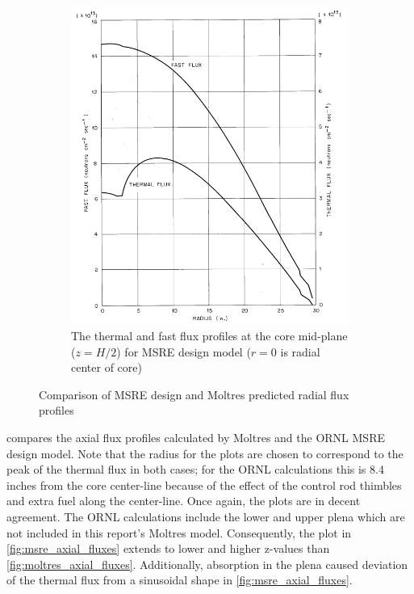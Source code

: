 \documentclass{article}
\makeatletter
\def\maxwidth#1{\ifdim\Gin@nat@width>#1 #1\else\Gin@nat@width\fi}
\makeatother
\begin{document}
\begin{figure}[htpb]
\begin{subfigure}[b]{.5\textwidth}
      \includegraphics[width=\maxwidth{\textwidth}]{msre_radial_fluxes.png}
      \caption{The thermal and fast flux profiles at the core mid-plane
        ($z=H/2$) for \gls{MSRE} design model \cite{briggs_molten-salt_1964}
        ($r=0$ is radial center of core)}
      \label{fig:msre_radial_fluxes}
    \end{subfigure}
    \caption{Comparison of \gls{MSRE} design and Moltres predicted radial
      flux profiles}
    \label{fig:radial_fluxes_compare}
\end{figure}

 compares the axial flux profiles calculated by
Moltres and the \gls{ORNL} \gls{MSRE} design model. Note that the radius for the
plots are chosen to correspond to the peak of the thermal flux in both cases;
for the \gls{ORNL} calculations this is 8.4 inches from the core center-line
because of the effect of the control rod thimbles and extra fuel along the
center-line. Once again, the plots are in decent agreement. The \gls{ORNL}
calculations include the lower and upper plena which are not included in this
report's Moltres model. Consequently, the plot in \cref{fig:msre_axial_fluxes}
extends to lower and higher z-values than
\cref{fig:moltres_axial_fluxes}. Additionally, absorption in the plena caused 
deviation of the thermal flux from a sinusoidal shape in 
\cref{fig:msre_axial_fluxes}.
\end{document}
